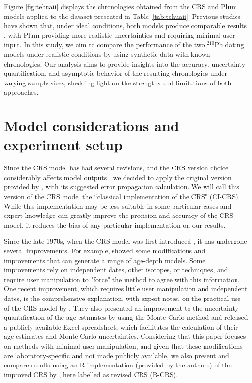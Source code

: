 \documentclass [10pt] {article}
\begin{document}
Figure \ref{fig:tehuaii} displays the chronologies obtained from the CRS and Plum models applied to the dataset presented in Table~\ref{tab:tehuaii}. Previous studies have shown that, under ideal conditions, both models produce comparable results \citep{Aquino2020}, with Plum providing more realistic uncertainties and requiring minimal user input. In this study, we aim to compare the performance of the two $^{210}$Pb dating models under realistic conditions by using synthetic data with known chronologies. Our analysis aims to provide insights into the accuracy, uncertainty quantification, and asymptotic behavior of the resulting chronologies under varying sample sizes, shedding light on the strengths and limitations of both approaches.


\section{Model considerations and experiment setup}\label{sec:exp_setup}

Since the CRS model has had several revisions, and the CRS version choice considerably affects model outputs \citep{Barsanti2020}, we decided to apply the original version provided by \citet{Appleby2001}, with its suggested error propagation calculation.  We will call this version of the CRS model the ``classical implementation of the CRS" (CI-CRS). 
While this implementation may be less suitable in some particular cases and expert knowledge can greatly improve the precision and accuracy of the CRS model, it reduces the bias of any particular implementation on our results.


Since the late 1970s, when the CRS model was first introduced \citep{Appleby1978,Robbins1978}, it has undergone several improvements.
For example, \citet{Barsanti2020} showed some modifications and improvements that can generate a range of age-depth models. Some improvements rely on independent dates, other isotopes, or techniques, and require user manipulation to "force" the method to agree with this information. One recent improvement, which requires little user manipulation and independent dates, is the comprehensive explanation, with expert notes, on the practical use of the CRS model by \citet{Sanchez-Cabeza2012}. 
They also presented an improvement to the uncertainty quantification of the age estimates by using the Monte Carlo method \citep{Sanchez-Cabeza2014} and released a publicly available Excel spreadsheet, which facilitates the calculation of their age estimates and Monte Carlo uncertainties. 
Considering that this paper focuses on methods with minimal user manipulation, and given that these modifications are laboratory-specific and not made publicly available, we also present and compare results using an R implementation (provided by the authors) of the improved CRS by \citet{Sanchez-Cabeza2014}, here labelled as revised CRS (R-CRS).
\end{document}

